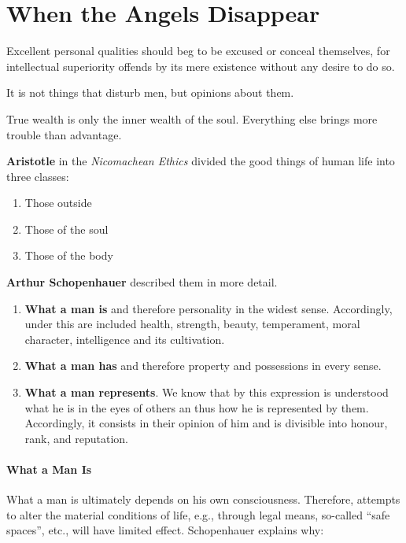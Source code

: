\section{When the Angels Disappear}

\begin{quotex}
Excellent personal qualities should beg to be excused or conceal themselves, for intellectual superiority offends by its
mere existence without any desire to do so. 

It is not things that disturb men, but opinions about them. 

True wealth is only the inner wealth of the soul. Everything else brings more trouble than advantage.  

\end{quotex}

\textbf{Aristotle }in the \emph{Nicomachean Ethics} divided the good things of human life into three classes:

\begin{enumerate}
\item Those outside 
\item Those of the soul 
\item Those of the body 
\end{enumerate}

\textbf{Arthur Schopenhauer} described them in more detail.

\begin{enumerate}
\item \textbf{What a man is} and therefore personality in the widest sense. Accordingly, under this are included health,
strength, beauty, temperament, moral character, intelligence and its cultivation. 
\item \textbf{What a man has} and therefore property and possessions in every sense. 
\item \textbf{What a man represents}. We know that by this expression is understood what he is in the eyes of others an
thus how he is represented by them. Accordingly, it consists in their opinion of him and is divisible into honour,
rank, and reputation. 
\end{enumerate}

\paragraph{What a Man Is}
What a man is ultimately depends on his own consciousness. Therefore, attempts to alter the material conditions of life,
e.g., through legal means, so-called “safe spaces”, etc., will have limited effect. Schopenhauer explains why:

